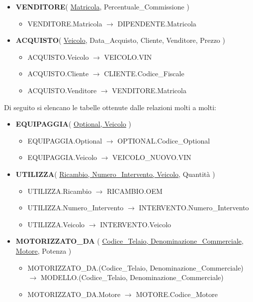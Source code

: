 \begin{itemize}
\begin{itemize}
        \item MECCANICO.Matricola $\rightarrow$ DIPENDENTE.Matricola
    \end{itemize}
    \item \textbf{VENDITORE}( \underline{Matricola}, Percentuale\_Commissione )
    \begin{itemize}
        \item VENDITORE.Matricola $\rightarrow$ DIPENDENTE.Matricola
    \end{itemize}
    \item \textbf{ACQUISTO}( \underline{Veicolo}, Data\_Acquisto, Cliente, Venditore, Prezzo )
    \begin{itemize}
        \item ACQUISTO.Veicolo $\rightarrow$ VEICOLO.VIN
        \item ACQUISTO.Cliente $\rightarrow$ CLIENTE.Codice\_Fiscale
        \item ACQUISTO.Venditore $\rightarrow$ VENDITORE.Matricola
    \end{itemize}
\end{itemize}

\vspace{0.5cm}
Di seguito si elencano le tabelle ottenute dalle relazioni molti a molti: 
\begin{itemize}
    \item \textbf{EQUIPAGGIA}( \underline{Optional, Veicolo} )
    \begin{itemize}
        \item EQUIPAGGIA.Optional $\rightarrow$ OPTIONAL.Codice\_Optional
        \item EQUIPAGGIA.Veicolo $\rightarrow$ VEICOLO\_NUOVO.VIN
    \end{itemize}
    \item \textbf{UTILIZZA}( \underline{Ricambio, Numero\_Intervento, Veicolo}, Quantità )
    \begin{itemize}
        \item UTILIZZA.Ricambio $\rightarrow$ RICAMBIO.OEM
        \item UTILIZZA.Numero\_Intervento $\rightarrow$ INTERVENTO.Numero\_Intervento
        \item UTILIZZA.Veicolo $\rightarrow$ INTERVENTO.Veicolo
    \end{itemize}
    \item \textbf{MOTORIZZATO\_DA} ( \underline{Codice\_Telaio, Denominazione\_Commerciale, Motore}, Potenza )
    \begin{itemize}
        \item MOTORIZZATO\_DA.(Codice\_Telaio, Denominazione\_Commerciale) $\rightarrow$ MODELLO.(Codice\_Telaio, Denominazione\_Commerciale)
        \item MOTORIZZATO\_DA.Motore $\rightarrow$ MOTORE.Codice\_Motore
    \end{itemize}
\end{itemize}

